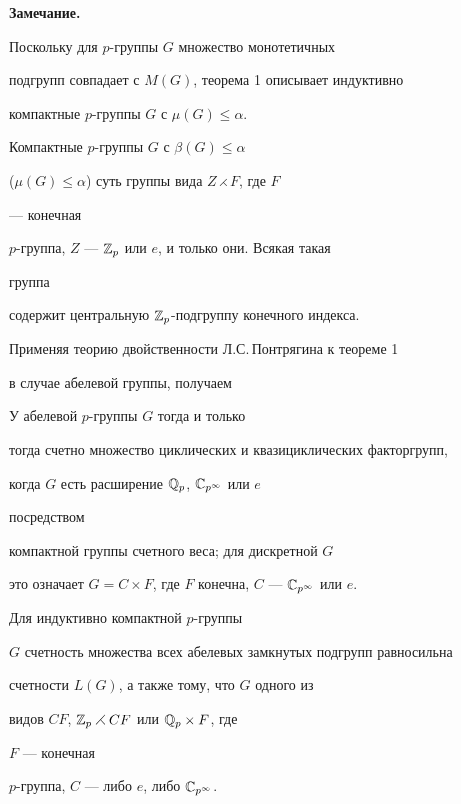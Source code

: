 \medskip 


 


{\bf Замечание.} 


Поскольку для $p$-группы $G$ множество монотетичных 


подгрупп совпадает с $M(G)$, теорема 1 описывает индуктивно 


компактные $p$-группы $G$ с $\mu(G)\le\alpha$. 


 


\begin{cor} 


Компактные $p$-группы $G$ с $\beta(G)\le\alpha$ 


($\mu(G)\le\alpha$) суть группы вида $Z\rightthreetimes F$, где $F$ 


--- конечная 


$p$-группа, $Z$ --- $\Bbb Z_p$ или $e$, и только они. Всякая такая 


группа  


содержит центральную $\Bbb Z_p$-подгруппу конечного индекса. 


\end{cor} 


 


Применяя теорию двойственности Л.С.\,Понтрягина к теореме 1 


в случае абелевой группы, получаем 


 


\begin{cor} 


У абелевой $p$-группы $G$ тогда и только 


тогда счетно множество циклических и квазициклических факторгрупп, 


когда $G$ есть расширение $\Bbb Q_p$, $\Bbb C_{p^\infty}$ или $e$ 


посредством 


компактной группы счетного веса; для дискретной $G$ 


это означает $G=C\times F$, где $F$ конечна, $C$ --- $\Bbb 


C_{p^\infty}$ или $e$. 


\end{cor} 


 


\begin{cor} 


Для индуктивно компактной $p$-группы  


$G$ счетность множества всех абелевых замкнутых подгрупп равносильна 


счетности $L(G)$, а также тому, что $G$ одного из  


видов $CF$, $\Bbb Z_p\rightthreetimes CF$ или $\Bbb Q_p\times F$, где 


$F$ --- конечная 


$p$-группа, $C$ --- либо $e$, либо $\Bbb C_{p^\infty}$. 


\end{cor} 


